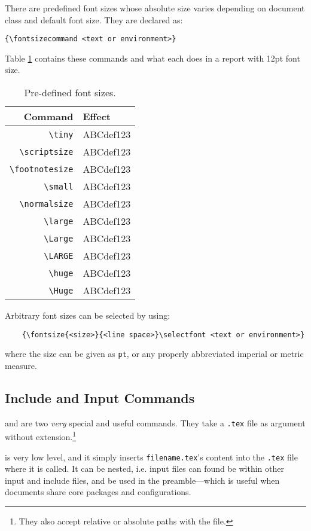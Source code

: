 There are predefined font sizes whose absolute size varies depending on document class and default font size. They are declared as:
\begin{verbatim}
{\fontsizecommand <text or environment>}
\end{verbatim}
Table \ref{t:fontsize} contains these commands and what each does in a report with 12pt font size.
\begin{table}[!htbp]
    \centering
    \caption{Pre-defined font sizes.}
    \label{t:fontsize}
    \begin{tabular}{rl}
        \toprule
        Command & Effect \\
        \midrule
        \verb|\tiny| & {\tiny ABCdef123} \\
        \verb|\scriptsize| & {\scriptsize ABCdef123} \\
        \verb|\footnotesize| & {\footnotesize ABCdef123} \\
        \verb|\small| & {\small ABCdef123} \\
        \verb|\normalsize| & {\normalsize ABCdef123} \\
        \verb|\large| & {\large ABCdef123} \\
        \verb|\Large| & {\Large ABCdef123} \\
        \verb|\LARGE| & {\LARGE ABCdef123} \\
        \verb|\huge| & {\huge ABCdef123} \\
        \verb|\Huge| & {\Huge ABCdef123} \\
        \bottomrule
    \end{tabular}
\end{table}

Arbitrary font sizes can be selected by using:
\begin{verbatim}
	{\fontsize{<size>}{<line space>}\selectfont <text or environment>}
\end{verbatim}
where the size can be given as \verb|pt|, or any properly abbreviated imperial or metric measure.
%
\subsection{Include and Input Commands}
%
\verb|| and \verb|| are two \emph{very} special and useful commands. They take a \texttt{.tex} file as argument without extension.\footnote{They also accept relative or absolute paths with the file.}

\verb|| is very low level, and it simply inserts \texttt{filename.tex}'s content into the \texttt{.tex} file where it is called. It can be nested, i.e. input files can found be within other input and include files, and be used in the preamble---which is useful when documents share core packages and configurations. 

